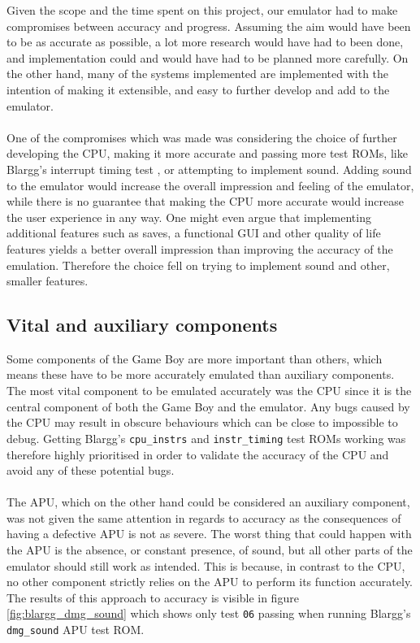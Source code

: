 Given the scope and the time spent on this project, our emulator had to make compromises between accuracy and progress. Assuming the aim would have been to be as accurate as possible, a lot more research would have had to been done, and implementation could and would have had to be planned more carefully. On the other hand, many of the systems implemented are implemented with the intention of making it extensible, and easy to further develop and add to the emulator.
\\\\
One of the compromises which was made was considering the choice of further developing the CPU, making it more accurate and passing more test ROMs, like Blargg's interrupt timing test \cite{Blargg}, or attempting to implement sound. Adding sound to the emulator would increase the overall impression and feeling of the emulator, while there is no guarantee that making the CPU more accurate would increase the user experience in any way. One might even argue that implementing additional features such as saves, a functional GUI and other quality of life features yields a better overall impression than improving the accuracy of the emulation. Therefore the choice fell on trying to implement sound and other, smaller features.

\subsection{Vital and auxiliary components}

Some components of the Game Boy are more important than others, which means these have to be more accurately emulated than auxiliary components. The most vital component to be emulated accurately was the CPU since it is the central component of both the Game Boy and the emulator. Any bugs caused by the CPU may result in obscure behaviours which can be close to impossible to debug. Getting Blargg's \texttt{cpu\_instrs} and \texttt{instr\_timing} \cite{Blargg} test ROMs working was therefore highly prioritised in order to validate the accuracy of the CPU and avoid any of these potential bugs.
\\\\
The APU, which on the other hand could be considered an auxiliary component, was not given the same attention in regards to accuracy as the consequences of having a defective APU is not as severe. The worst thing that could happen with the APU is the absence, or constant presence, of sound, but all other parts of the emulator should still work as intended. This is because, in contrast to the CPU, no other component strictly relies on the APU to perform its function accurately. The results of this approach to accuracy is visible in figure \ref{fig:blargg_dmg_sound} which shows only test \texttt{06} passing when running Blargg's \texttt{dmg\_sound} \cite{Blargg} APU test ROM.


